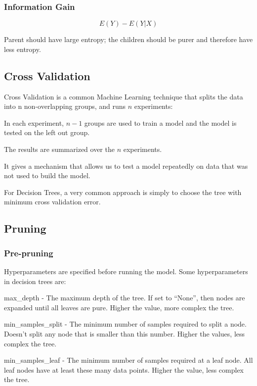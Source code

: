 	\subsubsection{Information Gain}
	\begin{equation}
		E(Y) - E(Y|X)
	\end{equation}
	\begin{mathwhere}[0.4in]
	\end{mathwhere}
Parent should have large entropy; the children should be purer and therefore have less entropy.

	\subsection{Cross Validation}
Cross Validation is a common Machine Learning technique that splits the data into n non-overlapping groups, and runs $n$ experiments:
	\begin{bulletedlist}
		\item In each experiment, $n-1$ groups are used to train a model and the model is tested on the left out group.
		\item The results are summarized over the $n$ experiments.
		\item It gives a mechanism that allows us to test a model repeatedly on data that was not used to build the model.
		\item For Decision Trees, a very common approach is simply to choose the tree with minimum cross validation error.
	\end{bulletedlist}

	\subsection{Pruning}
	\subsubsection{Pre-pruning}
Hyperparameters are specified before running the model.  Some hyperparameters in decision trees are:
	\begin{bulletedlist}
		\item max\_depth - The maximum depth of the tree. If set to ``None'', then nodes are expanded until all leaves are pure. Higher the value, more complex the tree.
		\item min\_samples\_split - The minimum number of samples required to split a node. Doesn't split any node that is smaller than this number. Higher the values, less complex the tree.
		\item min\_samples\_leaf - The minimum number of samples required at a leaf node. All leaf nodes have at least these many data points. Higher the value, less complex the tree.
	\end{bulletedlist}

